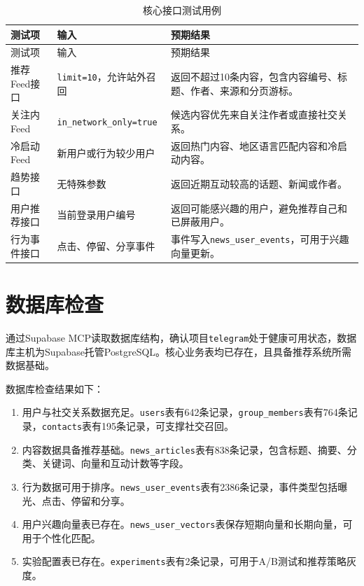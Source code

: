 \begin{longtable}{L{0.20\textwidth}L{0.30\textwidth}L{0.36\textwidth}}
  \caption{核心接口测试用例}                                                                      \\
  \toprule
  测试项      & 输入                              & 预期结果                                       \\
  \midrule
  \endfirsthead
  \toprule
  测试项      & 输入                              & 预期结果                                       \\
  \midrule
  \endhead
  推荐Feed接口 & \texttt{limit=10}，允许站外召回        & 返回不超过10条内容，包含内容编号、标题、作者、来源和分页游标。           \\
  关注内Feed  & \texttt{in\_network\_only=true} & 候选内容优先来自关注作者或直接社交关系。                       \\
  冷启动Feed  & 新用户或行为较少用户                      & 返回热门内容、地区语言匹配内容和冷启动内容。                     \\
  趋势接口     & 无特殊参数                           & 返回近期互动较高的话题、新闻或作者。                         \\
  用户推荐接口   & 当前登录用户编号                        & 返回可能感兴趣的用户，避免推荐自己和已屏蔽用户。                   \\
  行为事件接口   & 点击、停留、分享事件                      & 事件写入\texttt{news\_user\_events}，可用于兴趣向量更新。 \\
  \bottomrule
\end{longtable}

\section{数据库检查}

通过Supabase MCP读取数据库结构，确认项目\texttt{telegram}处于健康可用状态，数据库主机为Supabase托管PostgreSQL。核心业务表均已存在，且具备推荐系统所需数据基础。

数据库检查结果如下：

\begin{enumerate}
  \item 用户与社交关系数据充足。\texttt{users}表有642条记录，\texttt{group\_members}表有764条记录，\texttt{contacts}表有195条记录，可支撑社交召回。
  \item 内容数据具备推荐基础。\texttt{news\_articles}表有838条记录，包含标题、摘要、分类、关键词、向量和互动计数等字段。
  \item 行为数据可用于排序。\texttt{news\_user\_events}表有2386条记录，事件类型包括曝光、点击、停留和分享。
  \item 用户兴趣向量表已存在。\texttt{news\_user\_vectors}表保存短期向量和长期向量，可用于个性化匹配。
  \item 实验配置表已存在。\texttt{experiments}表有2条记录，可用于A/B测试和推荐策略灰度。
\end{enumerate}

